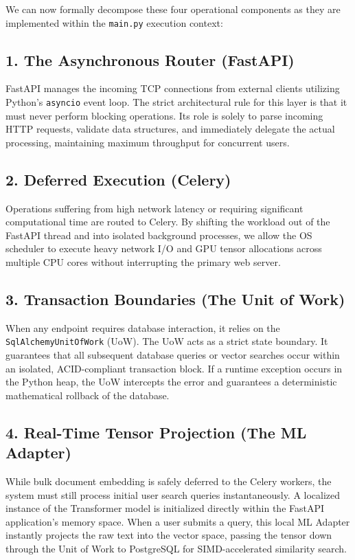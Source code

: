 We can now formally decompose these four operational components as they are implemented within the \texttt{main.py} execution context:

\subsection*{1. The Asynchronous Router (FastAPI)}
FastAPI manages the incoming TCP connections from external clients utilizing Python's \texttt{asyncio} event loop. The strict architectural rule for this layer is that it must never perform blocking operations. Its role is solely to parse incoming HTTP requests, validate data structures, and immediately delegate the actual processing, maintaining maximum throughput for concurrent users.

\subsection*{2. Deferred Execution (Celery)}
Operations suffering from high network latency or requiring significant computational time are routed to Celery. By shifting the workload out of the FastAPI thread and into isolated background processes, we allow the OS scheduler to execute heavy network I/O and GPU tensor allocations across multiple CPU cores without interrupting the primary web server.

\subsection*{3. Transaction Boundaries (The Unit of Work)}
When any endpoint requires database interaction, it relies on the \texttt{SqlAlchemyUnitOfWork} (UoW). The UoW acts as a strict state boundary. It guarantees that all subsequent database queries or vector searches occur within an isolated, ACID-compliant transaction block. If a runtime exception occurs in the Python heap, the UoW intercepts the error and guarantees a deterministic mathematical rollback of the database.

\subsection*{4. Real-Time Tensor Projection (The ML Adapter)}
While bulk document embedding is safely deferred to the Celery workers, the system must still process initial user search queries instantaneously. A localized instance of the Transformer model is initialized directly within the FastAPI application's memory space. When a user submits a query, this local ML Adapter instantly projects the raw text into the vector space, passing the tensor down through the Unit of Work to PostgreSQL for SIMD-accelerated similarity search.
